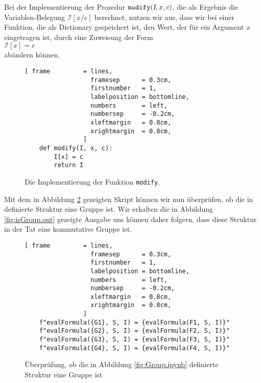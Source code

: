 Bei der Implementierung der Prozedur $\texttt{modify}(\textsl{I},x,c)$, die als Ergebnis die Variablen-Belegung $\mathcal{I}[x/c]$ berechnet, nutzen wir aus, dass
wir bei einer Funktion, die als Dictionary gespeichert ist, den Wert, der für ein Argument $x$ eingetragen ist,
durch eine Zuweisung der Form 
\\[0.2cm]
\hspace*{1.3cm}
$\mathcal{I}[x] \;\texttt{=}\; c$ 
\\[0.2cm]
abändern können.

\begin{figure}[!ht]
\centering
\begin{Verbatim}[ frame         = lines, 
                  framesep      = 0.3cm, 
                  firstnumber   = 1,
                  labelposition = bottomline,
                  numbers       = left,
                  numbersep     = -0.2cm,
                  xleftmargin   = 0.8cm,
                  xrightmargin  = 0.8cm,
                ]
    def modify(I, x, c):
        I[x] = c
        return I
\end{Verbatim}
\vspace*{-0.3cm}
\caption{Die Implementierung der Funktion \texttt{modify}.}
\label{fig:modify.ipynb}
\end{figure}
Mit dem in Abbildung \ref{fig:isGroup.ipynb} gezeigten Skript können wir nun überprüfen, ob die in
 definierte Struktur eine Gruppe ist.  Wir erhalten die in Abbildung \ref{fig:isGroup.out}
gezeigte Ausgabe uns können daher folgern, dass diese Struktur in der Tat eine kommutative Gruppe ist.

\begin{figure}[!ht]
\centering
\begin{Verbatim}[ frame         = lines, 
                  framesep      = 0.3cm, 
                  firstnumber   = 1,
                  labelposition = bottomline,
                  numbers       = left,
                  numbersep     = -0.2cm,
                  xleftmargin   = 0.8cm,
                  xrightmargin  = 0.8cm,
                ]
    f"evalFormula({G1}, S, I) = {evalFormula(F1, S, I)}"
    f"evalFormula({G2}, S, I) = {evalFormula(F2, S, I)}"
    f"evalFormula({G3}, S, I) = {evalFormula(F3, S, I)}"
    f"evalFormula({G4}, S, I) = {evalFormula(F4, S, I)}"
\end{Verbatim}
\vspace*{-0.3cm}
\caption{Überprüfung, ob die in Abbildung \ref{fig:Group.ipynb} definierte Struktur eine Gruppe ist}
\label{fig:isGroup.ipynb}
\end{figure}


